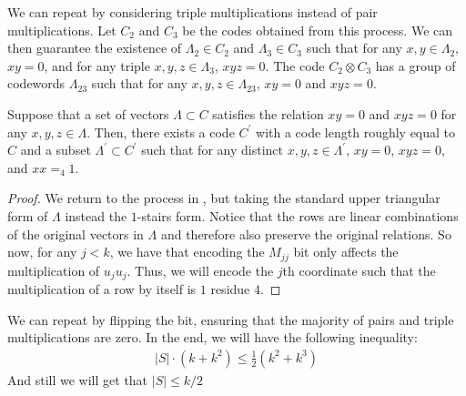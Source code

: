 \documentclass[manuscript,screen,review]{acmart}
\begin{document}
\begin{claim}
  We can repeat  by considering triple multiplications instead of pair multiplications. Let $C_{2}$ and $C_{3}$ be the codes obtained from this process. We can then guarantee the existence of $\Lambda_{2}\in C_{2}$ and $\Lambda_{3}\in C_{3}$ such that for any $x,y \in \Lambda_{2}$, $xy=0$, and for any triple $x,y,z \in \Lambda_{3}$, $xyz = 0$. The code $C_{2}\otimes C_{3}$ has a group of codewords $\Lambda_{23}$ such that for any $x,y,z \in \Lambda_{23}$, $xy =0$ and $xyz = 0$.
\end{claim}


\begin{claim} 
Suppose that a set of vectors $\Lambda \subset C$ satisfies the relation $xy = 0$ and $xyz = 0$ for any $x,y,z \in \Lambda$. Then, there exists a code $C^{\prime}$ with a code length roughly equal to $C$ and a subset $\Lambda^{\prime} \subset C^{\prime}$ such that for any distinct $x,y,z \in \Lambda^\prime$, $xy = 0$, $xyz = 0$, and $xx =_{4} 1$.
\end{claim}
\begin{proof}
   We return to the process in , but taking the standard upper triangular form of $\Lambda$ instead the $1$-stairs form. Notice that the rows are linear combinations of the original vectors in $\Lambda$ and therefore also preserve the original relations. So now, for any $j<k$, we have that encoding the $M_{jj}$ bit only affects the multiplication of $u_{j}u_{j}$. Thus, we will encode the $j$th coordinate such that the multiplication of a row by itself is $1$ residue $4$.
\end{proof}


\begin{claim} 
We can repeat  by flipping the bit, ensuring that the majority of pairs and triple multiplications are zero. In the end, we will have the following inequality:
  \begin{equation*}
    \begin{split}
      |S|\cdot \left( k + k^2 \right)\le \frac{1}{2}\left( k^{2} + k^{3} \right) 
    \end{split}
  \end{equation*}
  And still we will get that $|S| \le k/2$ 
\end{claim}


\ifdefined\MORE


\newcommand{\hashcode}{ checks-hashed }
\end{document}
